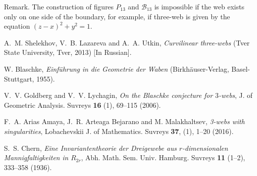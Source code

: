 \documentclass[
11pt,%
tightenlines,%
twoside,%
onecolumn,%
nofloats,%
nobibnotes,%
nofootinbib,%
superscriptaddress,%
noshowpacs,%
centertags]%
{revtex4}
\begin{document}
Remark. The construction of  figures $ P_{13} $ and $ \mathcal
{B}_{13} $ is  impossible if the web exists only on one side of the
boundary,  for example, if three-web is given by the equation
$(z-x)^2+y^2=1$.

\begin{thebibliography}{99}

A.~M. Shelekhov, V.~B. Lazareva  and A.~A. Utkin, \textit{Curvilinear three-webs} (Tver State University, Tver, 2013) [In Russian].

 W. Blaschke, \textit{Einf\"{u}hrung in die Geometrie der Waben}
(Birkh\"{a}user-Verlag, Basel-Stuttgart, 1955).

 V.~V. Goldberg  and V.~V. Lychagin,
\textit{On the Blaschke conjecture for $3$-webs}, J. of Geometric
Analysis. Suvreys \textbf{16} (1), 69--115 (2006).

 F.~A. Arias Amaya, J.~R. Arteaga Bejarano and M. Malakhaltsev, \textit{3-webs with singularities}, Lobachevskii J. of Mathematics. Suvreys  \textbf{37}, (1), 1--20 (2016).

S.~S. Chern,
\textit{Eine Invariantentheorie der Dreigewebe aus
$r$-dimensionalen Mannigfaltigkeiten in ${R}_{2r}$}, Abh.
Math.  Sem. Univ. Hamburg. Suvreys \textbf{11} (1--2), 333--358 (1936).

\end{thebibliography}
\end{document}
